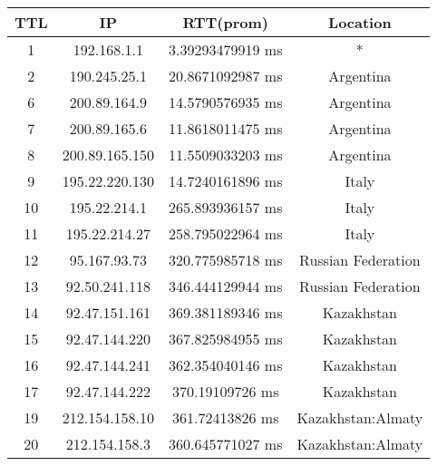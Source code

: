 
\begin{table}[h]
\begin{tabular}{@{}cccc@{}}
\toprule
TTL & IP             & RTT(prom)        & Location           \\ \midrule
1   & 192.168.1.1    & 3.39293479919 ms & *                  \\
2   & 190.245.25.1   & 20.8671092987 ms & Argentina          \\
6   & 200.89.164.9   & 14.5790576935 ms & Argentina          \\
7   & 200.89.165.6   & 11.8618011475 ms & Argentina          \\
8   & 200.89.165.150 & 11.5509033203 ms & Argentina          \\
9   & 195.22.220.130 & 14.7240161896 ms & Italy              \\
10  & 195.22.214.1   & 265.893936157 ms & Italy              \\
11  & 195.22.214.27  & 258.795022964 ms & Italy              \\
12  & 95.167.93.73   & 320.775985718 ms & Russian Federation \\
13  & 92.50.241.118  & 346.444129944 ms & Russian Federation \\
14  & 92.47.151.161  & 369.381189346 ms & Kazakhstan         \\
15  & 92.47.144.220  & 367.825984955 ms & Kazakhstan         \\
16  & 92.47.144.241  & 362.354040146 ms & Kazakhstan         \\
17  & 92.47.144.222  & 370.19109726 ms  & Kazakhstan         \\
19  & 212.154.158.10 & 361.72413826 ms  & Kazakhstan:Almaty  \\
20  & 212.154.158.3  & 360.645771027 ms & Kazakhstan:Almaty  \\ \bottomrule
\end{tabular}
\end{table}